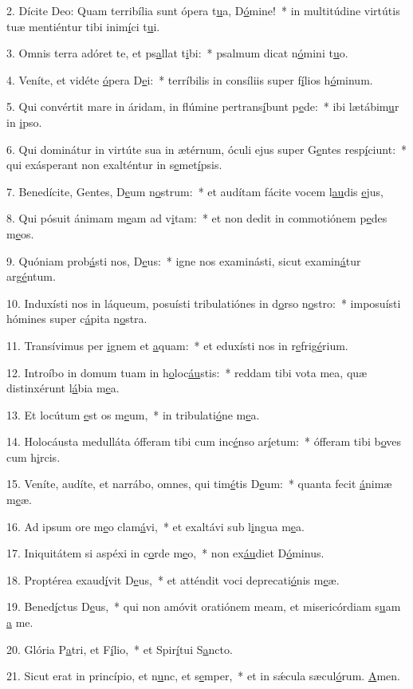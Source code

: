 2. Dícite Deo: Quam terribília sunt ópera t\uline{u}a, D\uline{ó}mine!~* in multitúdine virtútis tuæ mentiéntur tibi inim\uline{í}ci t\uline{u}i.\par 
3. Omnis terra adóret te, et ps\uline{a}llat t\uline{i}bi:~* psalmum dicat n\uline{ó}mini t\uline{u}o.\par 
4. Veníte, et vidéte \uline{ó}pera D\uline{e}i:~* terríbilis in consíliis super f\uline{í}lios h\uline{ó}minum.\par 
5. Qui convértit mare in áridam, in flúmine pertrans\uline{í}bunt p\uline{e}de:~* ibi lætábim\uline{u}r in \uline{i}pso.\par 
6. Qui dominátur in virtúte sua in ætérnum, óculi ejus super G\uline{e}ntes resp\uline{í}ciunt:~* qui exásperant non exalténtur in s\uline{e}met\uline{í}psis.\par 
7. Benedícite, Gentes, D\uline{e}um n\uline{o}strum:~* et audítam fácite vocem l\uline{au}dis \uline{e}jus,\par 
8. Qui pósuit ánimam m\uline{e}am ad v\uline{i}tam:~* et non dedit in commotiónem p\uline{e}des m\uline{e}os.\par 
9. Quóniam prob\uline{á}sti nos, D\uline{e}us:~* igne nos examinásti, sicut examin\uline{á}tur arg\uline{é}ntum.\par 
10. Induxísti nos in láqueum, posuísti tribulatiónes in d\uline{o}rso n\uline{o}stro:~* imposuísti hómines super c\uline{á}pita n\uline{o}stra.\par 
11. Transívimus per \uline{i}gnem et \uline{a}quam:~* et eduxísti nos in r\uline{e}frig\uline{é}rium.\par 
12. Introíbo in domum tuam in h\uline{o}loc\uline{áu}stis:~* reddam tibi vota mea, quæ distinxérunt l\uline{á}bia m\uline{e}a.\par 
13. Et locútum \uline{e}st os m\uline{e}um,~* in tribulati\uline{ó}ne m\uline{e}a.\par 
14. Holocáusta medulláta ófferam tibi cum inc\uline{é}nso ar\uline{í}etum:~* ófferam tibi b\uline{o}ves cum h\uline{i}rcis.\par 
15. Veníte, audíte, et narrábo, omnes, qui tim\uline{é}tis D\uline{e}um:~* quanta fecit \uline{á}nimæ m\uline{e}æ.\par 
16. Ad ipsum ore m\uline{e}o clam\uline{á}vi,~* et exaltávi sub l\uline{i}ngua m\uline{e}a.\par 
17. Iniquitátem si aspéxi in c\uline{o}rde m\uline{e}o,~* non ex\uline{áu}diet D\uline{ó}minus.\par 
18. Proptérea exaud\uline{í}vit D\uline{e}us,~* et atténdit voci deprecati\uline{ó}nis m\uline{e}æ.\par 
19. Bened\uline{í}ctus D\uline{e}us,~* qui non amóvit oratiónem meam, et misericórdiam s\uline{u}am \uline{a} me.\par 
20. Glória P\uline{a}tri, et F\uline{í}lio,~* et Spir\uline{í}tui S\uline{a}ncto.\par 
21. Sicut erat in princípio, et n\uline{u}nc, et s\uline{e}mper,~* et in sǽcula sæcul\uline{ó}rum. \uline{A}men.\par 
